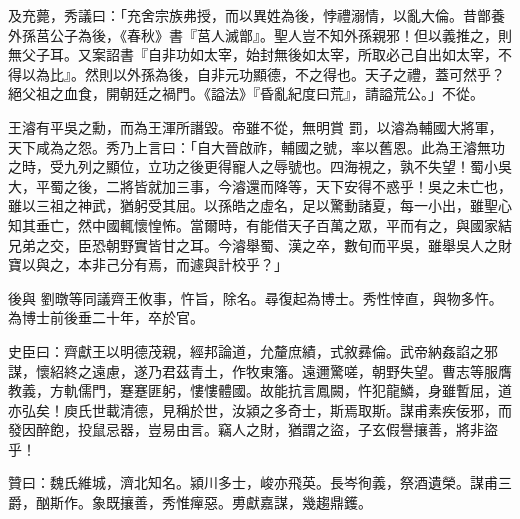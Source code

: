 \begin{pinyinscope}
 及充薨，秀議曰：「充舍宗族弗授，而以異姓為後，悖禮溺情，以亂大倫。昔鄫養外孫莒公子為後，《春秋》書『莒人滅鄫』。聖人豈不知外孫親邪！但以義推之，則無父子耳。又案詔書『自非功如太宰，始封無後如太宰，所取必己自出如太宰，不得以為比』。然則以外孫為後，自非元功顯德，不之得也。天子之禮，蓋可然乎？絕父祖之血食，開朝廷之禍門。《謚法》『昏亂紀度曰荒』，請謚荒公。」不從。



 王濬有平吳之勳，而為王渾所譖毀。帝雖不從，無明賞
 罰，以濬為輔國大將軍，天下咸為之怨。秀乃上言曰：「自大晉啟祚，輔國之號，率以舊恩。此為王濬無功之時，受九列之顯位，立功之後更得寵人之辱號也。四海視之，孰不失望！蜀小吳大，平蜀之後，二將皆就加三事，今濬還而降等，天下安得不惑乎！吳之未亡也，雖以三祖之神武，猶躬受其屈。以孫皓之虛名，足以驚動諸夏，每一小出，雖聖心知其垂亡，然中國輒懷惶怖。當爾時，有能借天子百萬之眾，平而有之，與國家結兄弟之交，臣恐朝野實皆甘之耳。今濬舉蜀、漢之卒，數旬而平吳，雖舉吳人之財寶以與之，本非己分有焉，而遽與計校乎？」



 後與
 劉暾等同議齊王攸事，忤旨，除名。尋復起為博士。秀性悻直，與物多忤。為博士前後垂二十年，卒於官。



 史臣曰：齊獻王以明德茂親，經邦論道，允釐庶績，式敘彞倫。武帝納姦諂之邪謀，懷紹終之遠慮，遂乃君茲青土，作牧東籓。遠邇驚嗟，朝野失望。曹志等服膺教義，方軌儒門，蹇蹇匪躬，慺慺體國。故能抗言鳳闕，忤犯龍鱗，身雖暫屈，道亦弘矣！庾氏世載清德，見稱於世，汝潁之多奇士，斯焉取斯。謀甫素疾佞邪，而發因醉飽，投鼠忌器，豈易由言。竊人之財，猶謂之盜，子玄假譽攘善，將非盜乎！



 贊曰：魏氏維城，濟北知名。潁川多士，峻亦飛英。長岑徇義，祭酒遺榮。謀甫三爵，酗斯作。象既攘善，秀惟癉惡。旉獻嘉謀，幾趨鼎鑊。



\end{pinyinscope}